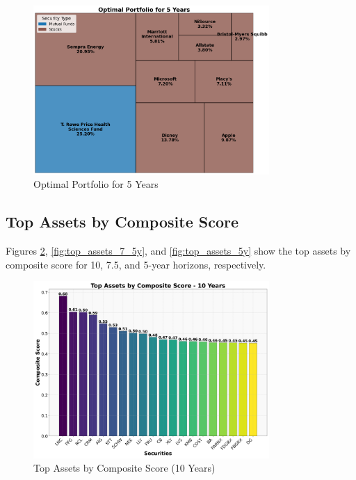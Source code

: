 \begin{figure}[!htbp]
    \centering
    \includegraphics[width=0.8\textwidth]{../Figures/optimal_portfolio_5_years.png}
    \caption{Optimal Portfolio for 5 Years}
    \label{fig:optimal_portfolio_5y}
\end{figure}

\subsection{Top Assets by Composite Score}
Figures \ref{fig:top_assets_10y}, \ref{fig:top_assets_7_5y}, and \ref{fig:top_assets_5y} show the top assets by composite score for 10, 7.5, and 5-year horizons, respectively.

\begin{figure}[!htbp]
    \centering
    \includegraphics[width=0.8\textwidth]{../Figures/top_assets_composite_score_10_years.png}
    \caption{Top Assets by Composite Score (10 Years)}
    \label{fig:top_assets_10y}
\end{figure}


